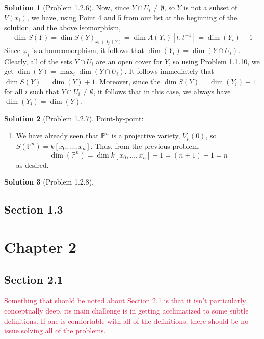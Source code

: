 \documentclass[aps,pra,showpacs,notitlepage,onecolumn,superscriptaddress,nofootinbib]{revtex4-1}
\newcommand{\pop}[1]{\textcolor{crimson}{#1}}
\theoremstyle{definition}
\newtheorem{solution}{Solution}[section]
\begin{document}
\begin{solution}[Problem 1.2.6]
  Now, since $Y \cap U_i \neq \emptyset$, so $Y$ is not a subset of $V(x_i)$, we have, using Point 4 and 5 from our list at the beginning of the solution, and the above isomorphism,
  \begin{equation}
    \dim S(Y) = \dim S(Y)_{x_i + I_p(Y)} = \dim A(Y_i)[t, t^{-1}] = \dim(Y_i) + 1
    \end{equation}
  Since $\varphi_i$ is a homeomorphism, it follows that $\dim(Y_i) = \dim(Y \cap U_i)$. Clearly, all of the sets $Y \cap U_i$ are an open cover for $Y$, so using
  Problem 1.1.10, we get $\dim(Y) = \max_{i} \dim(Y \cap U_i)$. It follows immediately that $\dim S(Y) = \dim(Y) + 1$. Moreover, since the $\dim S(Y) = \dim(Y_i) + 1$
  for all $i$ such that $Y \cap U_i \neq \emptyset$, it follows that in this case, we always have $\dim(Y_i) = \dim(Y)$.
  \end{solution}

\begin{solution}[Problem 1.2.7]
  Point-by-point:
  \begin{enumerate}
    \item We have already seen that $\mathbb{P}^n$ is a projective variety, $V_p(0)$, so $S(\mathbb{P}^n) = k[x_0, \dots, x_n]$. Thus,
      from the previous problem,
      \begin{equation}
        \dim(\mathbb{P}^n) = \dim k[x_0, \dots, x_n] - 1 = (n + 1) - 1 = n
        \end{equation}
      as desired.
      \end{enumerate}
  \end{solution}

\begin{solution}[Problem 1.2.8]

  \end{solution}

\subsection{Section 1.3}



\section{Chapter 2}

\subsection{Section 2.1}

\noindent \pop{Something that should be noted about Section 2.1 is that it isn't particularly conceptually deep, its main challenge is in getting acclimatized to some subtle definitions.
If one is comfortable with all of the definitions, there should be no issue solving all of the problems.}
\newline
\end{document}
